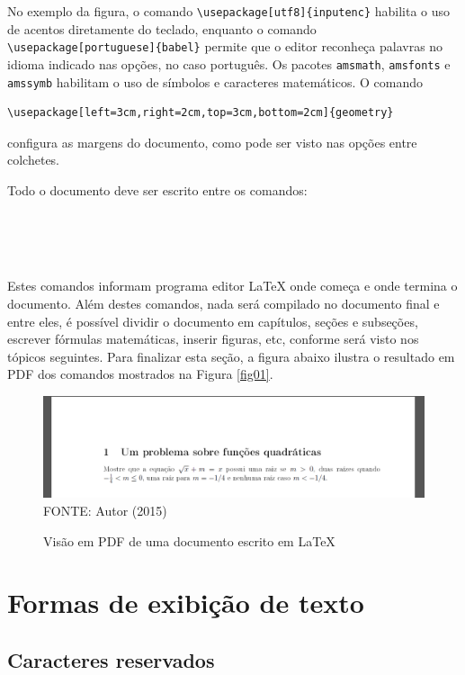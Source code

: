 No exemplo da figura, o comando \verb!\usepackage[utf8]{inputenc}! habilita o uso de acentos diretamente do teclado, enquanto o comando \verb!\usepackage[portuguese]{babel}! permite que o editor reconheça palavras no idioma indicado nas opções, no caso português. Os pacotes \verb!amsmath!, \verb!amsfonts! e \verb!amssymb! habilitam o uso de símbolos e caracteres matemáticos. O comando
\begin{verbatim}
\usepackage[left=3cm,right=2cm,top=3cm,bottom=2cm]{geometry}
\end{verbatim}
configura as margens do documento, como pode ser visto nas opções entre colchetes.

Todo o documento deve ser escrito entre os comandos:
\begin{verbatim}
	

	
\end{verbatim}

Estes comandos informam programa editor LaTeX onde começa e onde termina o documento. Além destes comandos, nada será compilado no documento final e entre eles, é possível dividir o documento em capítulos, seções e subseções, escrever fórmulas matemáticas, inserir figuras, etc, conforme será visto nos tópicos seguintes. Para finalizar esta seção, a figura abaixo ilustra o resultado em PDF dos comandos mostrados na Figura \ref{fig01}.
	\begin{figure}[H]
	\centering
	\caption{Visão em PDF de uma documento escrito em LaTeX}
	\includegraphics[scale=0.4]
	{img/fig02.png}\label{fig02}\\
	FONTE: Autor (2015)
	\end{figure}
	
\section{Formas de exibição de texto}

\subsection{Caracteres reservados}

